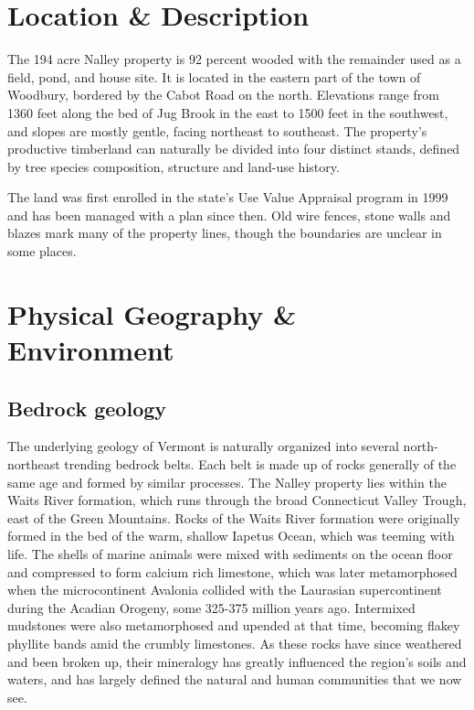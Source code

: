 \documentclass[]{tufte-handout}
\begin{document}
\section{Location \& Description}\label{location-description}

The 194 acre Nalley property is 92 percent wooded with the remainder
used as a field, pond, and house site. It is located in the eastern part
of the town of Woodbury, bordered by the Cabot Road on the north.
Elevations range from 1360 feet along the bed of Jug Brook in the east
to 1500 feet in the southwest, and slopes are mostly gentle, facing
northeast to southeast. The property's productive timberland can
naturally be divided into four distinct stands, defined by tree species
composition, structure and land-use history.

The land was first enrolled in the state's Use Value Appraisal program
in 1999 and has been managed with a plan since then. Old wire fences,
stone walls and blazes mark many of the property lines, though the
boundaries are unclear in some places.

\section{Physical Geography \&
Environment}\label{physical-geography-environment}

\subsection{Bedrock geology}\label{bedrock-geology}

The underlying geology of Vermont is naturally organized into several
north-northeast trending bedrock belts. Each belt is made up of rocks
generally of the same age and formed by similar processes. The Nalley
property lies within the Waits River formation, which runs through the
broad Connecticut Valley Trough, east of the Green Mountains. Rocks of
the Waits River formation were originally formed in the bed of the warm,
shallow Iapetus Ocean, which was teeming with life. The shells of marine
animals were mixed with sediments on the ocean floor and compressed to
form calcium rich limestone, which was later metamorphosed when the
microcontinent Avalonia collided with the Laurasian supercontinent
during the Acadian Orogeny, some 325-375 million years ago. Intermixed
mudstones were also metamorphosed and upended at that time, becoming
flakey phyllite bands amid the crumbly limestones. As these rocks have
since weathered and been broken up, their mineralogy has greatly
influenced the region's soils and waters, and has largely defined the
natural and human communities that we now see.
\end{document}
